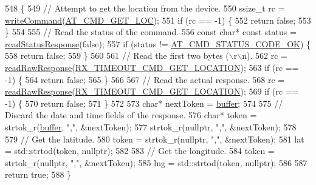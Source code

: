 \begin{DoxyCode}
548 \{
549     \textcolor{comment}{// Attempt to get the location from the device.}
550     ssize\_t rc = \hyperlink{class_u_blox_af604d1897a66192bf1c2a11997f2634d}{writeCommand}(\hyperlink{_u_blox_8cpp_a16caadc47b536971a5930368743e04ef}{AT\_CMD\_GET\_LOC});
551     \textcolor{keywordflow}{if} (rc == -1) \{
552         \textcolor{keywordflow}{return} \textcolor{keyword}{false};
553     \}
554 
555     \textcolor{comment}{// Read the status of the command.}
556     \textcolor{keyword}{const} \textcolor{keywordtype}{char}* \textcolor{keyword}{const} status = \hyperlink{class_u_blox_a4eaca5b1b1c4b5b6f6164b220dd43e0b}{readStatusResponse}(\textcolor{keyword}{false});
557     \textcolor{keywordflow}{if} (status != \hyperlink{_u_blox_8cpp_a6ebc1682eb6b9964fccb4a61688ff307}{AT\_CMD\_STATUS\_CODE\_OK}) \{
558         \textcolor{keywordflow}{return} \textcolor{keyword}{false};
559     \}
560 
561     \textcolor{comment}{// Read the first two bytes (\(\backslash\)r\(\backslash\)n).}
562     rc = \hyperlink{class_u_blox_ab4a7ab4b8922d91e23f273ae160c1bed}{readRawResponse}(\hyperlink{_u_blox_8cpp_a0fa12faf54d3283cbdc01e99f2c9912a}{RX\_TIMEOUT\_CMD\_GET\_LOCATION});
563     \textcolor{keywordflow}{if} (rc == -1) \{
564         \textcolor{keywordflow}{return} \textcolor{keyword}{false};
565     \}
566 
567     \textcolor{comment}{// Read the actual response.}
568     rc = \hyperlink{class_u_blox_ab4a7ab4b8922d91e23f273ae160c1bed}{readRawResponse}(\hyperlink{_u_blox_8cpp_a0fa12faf54d3283cbdc01e99f2c9912a}{RX\_TIMEOUT\_CMD\_GET\_LOCATION});
569     \textcolor{keywordflow}{if} (rc == -1) \{
570         \textcolor{keywordflow}{return} \textcolor{keyword}{false};
571     \}
572 
573     \textcolor{keywordtype}{char}* nextToken = \hyperlink{class_u_blox_a6ca4b90f3dc4e856181dce1ebda6f82c}{buffer};
574 
575     \textcolor{comment}{// Discard the date and time fields of the response.}
576     \textcolor{keywordtype}{char}* token = strtok\_r(\hyperlink{class_u_blox_a6ca4b90f3dc4e856181dce1ebda6f82c}{buffer}, \textcolor{stringliteral}{","}, &nextToken);
577     strtok\_r(\textcolor{keyword}{nullptr}, \textcolor{stringliteral}{","}, &nextToken);
578 
579     \textcolor{comment}{// Get the latitude.}
580     token = strtok\_r(\textcolor{keyword}{nullptr}, \textcolor{stringliteral}{","}, &nextToken);
581     lat = std::strtod(token, \textcolor{keyword}{nullptr});
582 
583     \textcolor{comment}{// Get the longitude.}
584     token = strtok\_r(\textcolor{keyword}{nullptr}, \textcolor{stringliteral}{","}, &nextToken);
585     lng = std::strtod(token, \textcolor{keyword}{nullptr});
586 
587     \textcolor{keywordflow}{return} \textcolor{keyword}{true};
588 \}
\end{DoxyCode}
